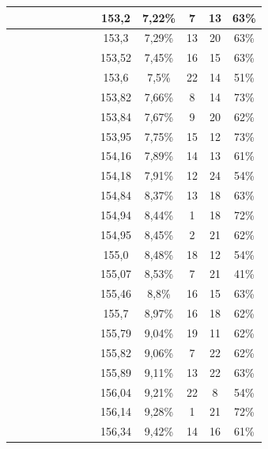 \begin{center}
\begin{longtable}{|c|c|c|c|c|c|c|c|c|c|c|c|c|}
 \x &  \x &  \x &  &  &  &  \x &  \x & 153,2 & 7,22\% & 7 & 13 & 63\% \\ \hline
 \x &  &  \x &  \x &  \x &  &  \x &  \x & 153,3 & 7,29\% & 13 & 20 & 63\% \\ \hline
 \x &  &  \x &  \x &  &  &  \x &  \x & 153,52 & 7,45\% & 16 & 15 & 63\% \\ \hline
 \x &  &  &  \x &  &  &  &  \x & 153,6 & 7,5\% & 22 & 14 & 51\% \\ \hline
 \x &  \x &  \x &  &  &  \x &  \x &  \x & 153,82 & 7,66\% & 8 & 14 & 73\% \\ \hline
 \x &  &  \x &  \x &  \x &  &  &  \x & 153,84 & 7,67\% & 9 & 20 & 62\% \\ \hline
 \x &  &  &  &  \x &  \x &  &  \x & 153,95 & 7,75\% & 15 & 12 & 73\% \\ \hline
 \x &  &  \x &  &  \x &  &  &  \x & 154,16 & 7,89\% & 14 & 13 & 61\% \\ \hline
 \x &  \x &  &  \x &  &  &  &  \x & 154,18 & 7,91\% & 12 & 24 & 54\% \\ \hline
 \x &  \x &  \x &  \x &  &  &  \x &  \x & 154,84 & 8,37\% & 13 & 18 & 63\% \\ \hline
 \x &  &  &  \x &  \x &  \x &  \x &  \x & 154,94 & 8,44\% & 1 & 18 & 72\% \\ \hline
 \x &  \x &  \x &  \x &  &  &  \x &  \x & 154,95 & 8,45\% & 2 & 21 & 62\% \\ \hline
 \x &  \x &  &  \x &  &  &  \x &  \x & 155,0 & 8,48\% & 18 & 12 & 54\% \\ \hline
 \x &  &  &  &  &  &  &  \x & 155,07 & 8,53\% & 7 & 21 & 41\% \\ \hline
 \x &  \x &  \x &  &  \x &  &  \x &  \x & 155,46 & 8,8\% & 16 & 15 & 63\% \\ \hline
 \x &  &  \x &  \x &  \x &  &  \x &  \x & 155,7 & 8,97\% & 16 & 18 & 62\% \\ \hline
 \x &  \x &  \x &  \x &  \x &  &  &  \x & 155,79 & 9,04\% & 19 & 11 & 62\% \\ \hline
 \x &  \x &  \x &  &  &  &  \x &  \x & 155,82 & 9,06\% & 7 & 22 & 62\% \\ \hline
 \x &  &  \x &  \x &  &  &  \x &  \x & 155,89 & 9,11\% & 13 & 22 & 63\% \\ \hline
 \x &  \x &  &  &  &  &  \x &  \x & 156,04 & 9,21\% & 22 & 8 & 54\% \\ \hline
 \x &  &  &  \x &  &  \x &  &  \x & 156,14 & 9,28\% & 1 & 21 & 72\% \\ \hline
 \x &  \x &  &  &  \x &  &  \x &  \x & 156,34 & 9,42\% & 14 & 16 & 61\% \\ \hline

\end{longtable}
\end{center}
